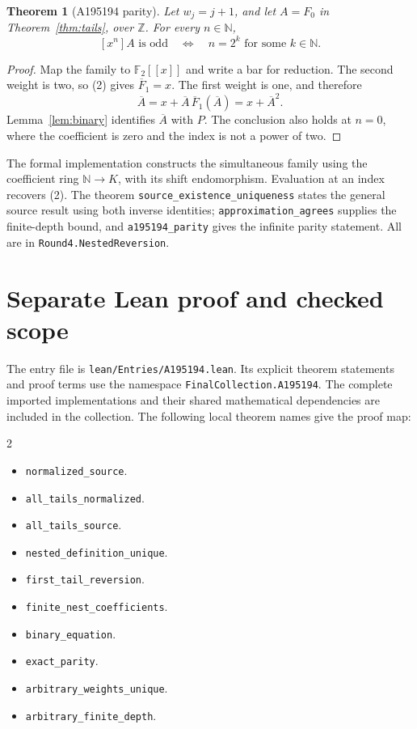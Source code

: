 \documentclass[11pt,a4paper]{article}
\newtheorem{theorem}{Theorem}[section]
\theoremstyle{remark}
\newcommand{\Z}{\mathbb Z}
\newcommand{\N}{\mathbb N}
\newcommand{\F}{\mathbb F}
\begin{document}
\begin{theorem}[A195194 parity]\label{thm:nestedparity}
Let $w_j=j+1$, and let $A=F_0$ in Theorem~\ref{thm:tails}, over $\Z$.
For every $n\in\N$,
\[
 [x^n]A\text{ is odd}\quad\Longleftrightarrow\quad
 n=2^k\text{ for some }k\in\N.
\]
\end{theorem}

\begin{proof}
Map the family to $\F_2[[x]]$ and write a bar for reduction. The second
weight is two, so (2) gives $\overline F_1=x$. The first weight is one,
and therefore
\[
 \overline A=x+\overline A\,\overline F_1(\overline A)
             =x+\overline A^2.
\]
Lemma~\ref{lem:binary} identifies $\overline A$ with $P$. The conclusion
also holds at $n=0$, where the coefficient is zero and the index is not a
power of two.
\end{proof}

The formal implementation constructs the simultaneous family using the
coefficient ring $\N\to K$, with its shift endomorphism. Evaluation at an
index recovers (2). The theorem \texttt{source\_existence\_uniqueness}
states the general source result using both inverse identities;
\texttt{approximation\_agrees} supplies the finite-depth bound, and
\texttt{a195194\_parity} gives the infinite parity statement. All are in
\texttt{Round4.NestedReversion}.


\section{Separate Lean proof and checked scope}

The entry file is \nolinkurl{lean/Entries/A195194.lean}. Its explicit
theorem statements and proof terms use the namespace
\nolinkurl{FinalCollection.A195194}. The complete imported implementations
and their shared mathematical dependencies are included in the collection.
The following local theorem names give the proof map:

\begin{multicols}{2}\raggedright\begin{itemize}\setlength{\itemsep}{2pt}\setlength{\parsep}{0pt}
\item \nolinkurl{normalized_source}.
\item \nolinkurl{all_tails_normalized}.
\item \nolinkurl{all_tails_source}.
\item \nolinkurl{nested_definition_unique}.
\item \nolinkurl{first_tail_reversion}.
\item \nolinkurl{finite_nest_coefficients}.
\item \nolinkurl{binary_equation}.
\item \nolinkurl{exact_parity}.
\item \nolinkurl{arbitrary_weights_unique}.
\item \nolinkurl{arbitrary_finite_depth}.
\end{itemize}\end{multicols}
\end{document}
